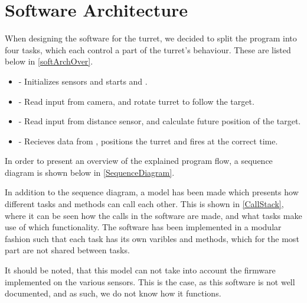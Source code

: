 \section{Software Architecture}
When designing the software for the turret, we decided to split the program
into four tasks, which each control a part of the turret's behaviour. These are
listed below in \autoref{softArchOver}.

\begin{itemize}\label{softArchOver}
  \item {} - Initializes sensors and starts  and
  .
  \item {} - Read input from camera, and rotate turret to follow the
  target.
  \item {} - Read input from distance sensor, and
  calculate future position of the target.
  \item {} - Recieves data from ,
  positions the turret and fires at the correct time.
\end{itemize}

In order to present an overview of the explained program flow, a sequence
diagram is shown below in \autoref{SequenceDiagram}.


In addition to the sequence diagram, a model has been made which presents how
different tasks and methods can call each other. This is shown in
\autoref{CallStack}, where it can be seen how the calls in the software are
made, and what tasks make use of which functionality. The software has been
implemented in a modular fashion such that each task has its own varibles and
methods, which for the most part are not shared between tasks.\nl


It should be noted, that this model can not take into account the firmware
implemented on the various sensors. This is the case, as this software is not
well documented, and as such, we do not know how it functions.